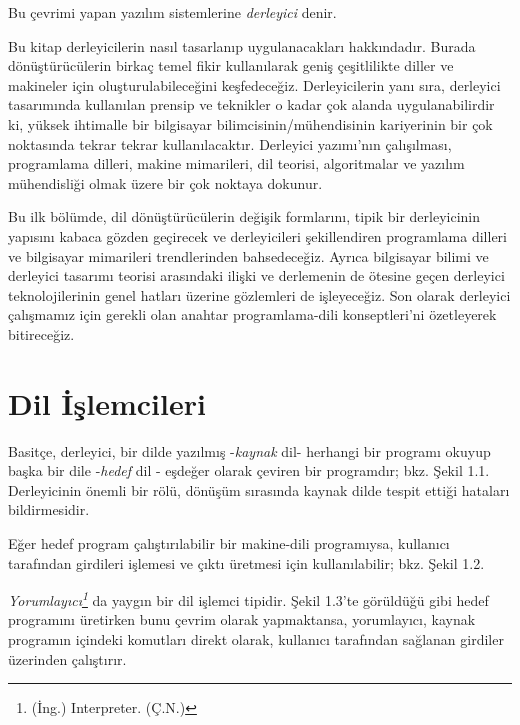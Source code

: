 \documentclass{book}
\begin{document}
Bu çevrimi yapan yazılım sistemlerine  \textit{derleyici} denir.

Bu kitap derleyicilerin nasıl tasarlanıp uygulanacakları hakkındadır. Burada dönüştürücülerin birkaç temel fikir kullanılarak geniş çeşitlilikte diller ve makineler için oluşturulabileceğini keşfedeceğiz. Derleyicilerin yanı sıra, derleyici tasarımında kullanılan prensip ve teknikler o kadar çok alanda uygulanabilirdir ki, yüksek ihtimalle bir bilgisayar bilimcisinin/mühendisinin kariyerinin bir çok noktasında tekrar tekrar kullanılacaktır. Derleyici yazımı'nın çalışılması, programlama dilleri, makine mimarileri, dil teorisi, algoritmalar ve yazılım mühendisliği olmak üzere bir çok noktaya dokunur.

Bu ilk bölümde, dil dönüştürücülerin değişik formlarını, tipik bir derleyicinin yapısını kabaca gözden geçirecek ve derleyicileri şekillendiren programlama dilleri ve bilgisayar mimarileri trendlerinden bahsedeceğiz. Ayrıca bilgisayar bilimi ve derleyici tasarımı teorisi arasındaki ilişki ve derlemenin de ötesine geçen derleyici teknolojilerinin genel hatları üzerine gözlemleri de işleyeceğiz. Son olarak derleyici çalışmamız için gerekli olan anahtar programlama-dili konseptleri'ni özetleyerek bitireceğiz.

\section{Dil İşlemcileri}

Basitçe, derleyici, bir dilde yazılmış -\textit{kaynak} dil- herhangi bir programı okuyup başka bir dile -\textit{hedef} dil -  eşdeğer olarak çeviren bir programdır; bkz. Şekil 1.1. Derleyicinin önemli bir rölü, dönüşüm sırasında kaynak dilde tespit ettiği hataları bildirmesidir.



Eğer hedef program çalıştırılabilir bir makine-dili programıysa, kullanıcı tarafından girdileri işlemesi ve çıktı üretmesi için kullanılabilir; bkz. Şekil 1.2.



\renewcommand{\thefootnote}{\fnsymbol{footnote}}
\textit{Yorumlayıcı\footnote{(İng.) Interpreter. (Ç.N.)}} da yaygın bir dil işlemci tipidir. Şekil 1.3'te görüldüğü gibi hedef programını üretirken bunu çevrim olarak yapmaktansa, yorumlayıcı, kaynak programın içindeki komutları direkt olarak, kullanıcı tarafından sağlanan girdiler üzerinden çalıştırır.


\end{document}
